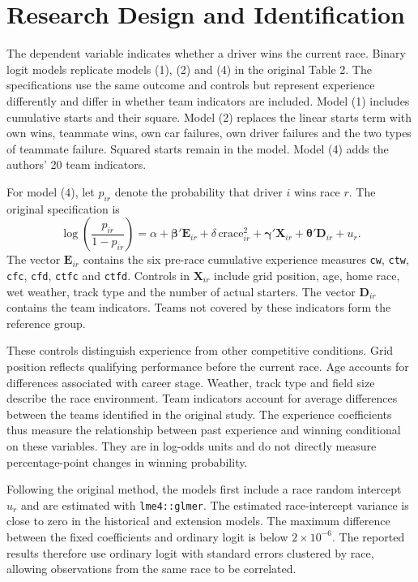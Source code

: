 \documentclass[11pt,letterpaper]{article}
\newcommand{\vname}[1]{\texttt{#1}}
\begin{document}
\section{Research Design and Identification}

The dependent variable indicates whether a driver wins the current race. Binary logit models replicate models (1), (2) and (4) in the original Table 2. The specifications use the same outcome and controls but represent experience differently and differ in whether team indicators are included. Model (1) includes cumulative starts and their square. Model (2) replaces the linear starts term with own wins, teammate wins, own car failures, own driver failures and the two types of teammate failure. Squared starts remain in the model. Model (4) adds the authors' 20 team indicators.

For model (4), let $p_{ir}$ denote the probability that driver $i$ wins race $r$. The original specification is
\[
\log\left(\frac{p_{ir}}{1-p_{ir}}\right)
=\alpha+\boldsymbol{\beta}'\mathbf{E}_{ir}
+\delta\,\mathrm{crace}_{ir}^{2}
+\boldsymbol{\gamma}'\mathbf{X}_{ir}
+\boldsymbol{\theta}'\mathbf{D}_{ir}+u_r.
\]
The vector $\mathbf{E}_{ir}$ contains the six pre-race cumulative experience measures \vname{cw}, \vname{ctw}, \vname{cfc}, \vname{cfd}, \vname{ctfc} and \vname{ctfd}. Controls in $\mathbf{X}_{ir}$ include grid position, age, home race, wet weather, track type and the number of actual starters. The vector $\mathbf{D}_{ir}$ contains the team indicators. Teams not covered by these indicators form the reference group.

These controls distinguish experience from other competitive conditions. Grid position reflects qualifying performance before the current race. Age accounts for differences associated with career stage. Weather, track type and field size describe the race environment. Team indicators account for average differences between the teams identified in the original study. The experience coefficients thus measure the relationship between past experience and winning conditional on these variables. They are in log-odds units and do not directly measure percentage-point changes in winning probability.

Following the original method, the models first include a race random intercept $u_r$ and are estimated with \vname{lme4::glmer}. The estimated race-intercept variance is close to zero in the historical and extension models. The maximum difference between the fixed coefficients and ordinary logit is below $2\times10^{-6}$. The reported results therefore use ordinary logit with standard errors clustered by race, allowing observations from the same race to be correlated.
\end{document}
